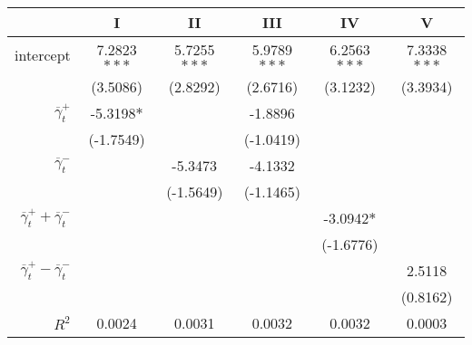 \begin{tabular}{rSSSSS}
\toprule
{} &            I &           II &          III &           IV &            V \\
\midrule
intercept &  7.2823$***$ &  5.7255$***$ &  5.9789$***$ &  6.2563$***$ &  7.3338$***$ \\
          &     (3.5086) &     (2.8292) &     (2.6716) &     (3.1232) &     (3.3934) \\
$\overline \gamma^+_t$       &   -5.3198$*$ &              &      -1.8896 &              &              \\
          &    (-1.7549) &              &    (-1.0419) &              &              \\
$\overline \gamma^-_t$       &              &      -5.3473 &      -4.1332 &              &              \\
          &              &    (-1.5649) &    (-1.1465) &              &              \\
$\overline \gamma^+_t + \overline \gamma^-_t$   &              &              &              &   -3.0942$*$ &              \\
          &              &              &              &    (-1.6776) &              \\
$\overline \gamma^+_t - \overline \gamma^-_t$  &              &              &              &              &       2.5118 \\
          &              &              &              &              &     (0.8162) \\
\midrule
$R^2$ & 0.0024 & 0.0031 & 0.0032 & 0.0032 & 0.0003\\\bottomrule
\end{tabular}
